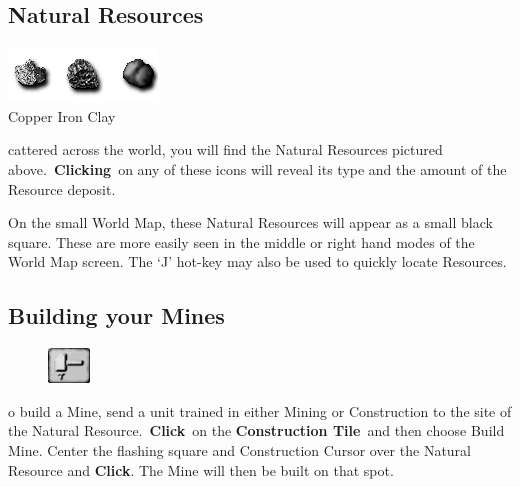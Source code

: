 \subsection{Natural Resources}


\begin{center}
\includegraphics[width=0.5\linewidth]{Iresources}
\\ Copper Iron Clay
\end{center}

cattered across the world, you will find the Natural Resources pictured above. \textbf{Clicking} on any of these icons will reveal its type and the amount of the Resource deposit.


On the small World Map, these Natural Resources will appear as a small black square. These are more easily seen in the middle or right hand modes of the World Map screen. The ‘J’ hot-key may also be used to quickly locate Resources.

\subsection{Building your Mines}


\begin{figure}
	\vspace{-20pt}
	\begin{center}
		\includegraphics[width=0.1\textwidth]{Thammer}
	\end{center}
	\vspace{-20pt}
\end{figure}

o build a Mine, send a unit trained in either Mining or Construction to the site of the Natural Resource. \textbf{Click} on the \textbf{Construction Tile} and then choose Build Mine. Center the flashing square and Construction Cursor over the Natural Resource and \textbf{Click}. The Mine will then be built on that spot.

